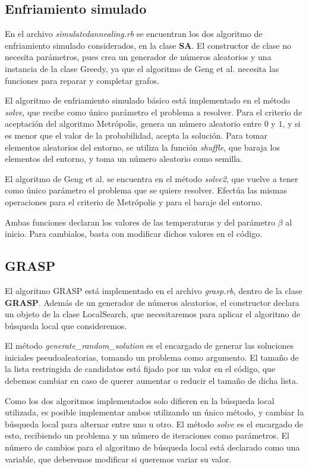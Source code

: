 \subsection{Enfriamiento simulado}

En el archivo \textit{simulatedannealing.rb} se encuentran los dos algoritmo de
enfriamiento simulado considerados, en la clase \textbf{SA}. El constructor de
clase no necesita parámetros, pues crea un generador de números aleatorios y
una instancia de la clase Greedy, ya que el algoritmo de Geng et al. necesita
las funciones para reparar y completar grafos.

El algoritmo de enfriamiento simulado básico está implementado en el método
\textit{solve}, que recibe como único parámetro el problema a resolver. Para el
criterio de aceptación del algoritmo Metrópolis, genera un número aleatorio entre
$0$ y $1$, y si es menor que el valor de la probabilidad, acepta la solución.
Para tomar elementos aleatorios del entorno, se utiliza la función \textit{shuffle},
que baraja los elementos del entorno, y toma un número aleatorio como semilla.

El algoritmo de Geng et al. se encuentra en el método \textit{solve2}, que vuelve
a tener como único parámetro el problema que se quiere resolver. Efectúa las mismas
operaciones para el criterio de Metrópolis y para el baraje del entorno.

Ambas funciones declaran los valores de las temperaturas y del parámetro $\beta$
al inicio. Para cambialos, basta con modificar dichos valores en el código.

\subsection{GRASP}

El algoritmo GRASP está implementado en el archivo \textit{grasp.rb}, dentro de la
clase \textbf{GRASP}. Además de un generador de números aleatorios, el constructor
declara un objeto de la clase LocalSearch, que necesitaremos para aplicar el
algoritmo de búsqueda local que consideremos.

El método \textit{generate_random_solution} es el encargado de generar las soluciones
iniciales pseudoaleatorias, tomando un problema como argumento. El tamaño de la
lista restringida de candidatos está fijado por un valor en el código, que debemos
cambiar en caso de querer aumentar o reducir el tamaño de dicha lista.

Como los dos algoritmos implementados solo difieren en la búsqueda local utilizada,
es posible implementar ambos utilizando un único método, y cambiar la búsqueda local
para alternar entre uno u otro. El método \textit{solve} es el encargado de esto,
recibiendo un problema y un número de iteraciones como parámetros. El número de
cambios para el algoritmo de búsqueda local está declarado como una variable, que
deberemos modificar si queremos variar su valor.

